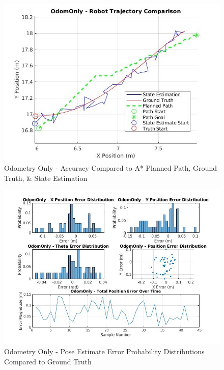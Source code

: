 \documentclass[
  letterpaper,
  DIV=11,
  numbers=noendperiod]{scrartcl}
\begin{document}
\begin{figure}

{\centering \includegraphics{odom-only-trajectory.png}

}

\caption{\label{fig-odom-only-trajectory}Odometry Only - Accuracy
Compared to A* Planned Path, Ground Truth, \& State Estimation}

\end{figure}

\begin{figure}

{\centering \includegraphics{odom-only-error.png}

}

\caption{\label{fig-odom-only-error}Odometry Only - Pose Estimate Error
Probability Distributions Compared to Ground Truth}

\end{figure}
\end{document}
